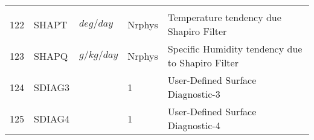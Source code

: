 \begin{tabular}{lllll}
\begin{minipage}[t]{3in}
         \end{minipage}\\
122& SHAPT    &    $deg/day$ &  Nrphys
         &\begin{minipage}[t]{3in}
          {Temperature tendency due Shapiro Filter}
         \end{minipage}\\
123& SHAPQ    &    $g/kg/day$ &  Nrphys
         &\begin{minipage}[t]{3in}
          {Specific Humidity tendency due to Shapiro Filter}
         \end{minipage}\\
124& SDIAG3   &             &    1  
         &\begin{minipage}[t]{3in}
          {User-Defined Surface Diagnostic-3} 
         \end{minipage}\\
125& SDIAG4   &             &    1  
         &\begin{minipage}[t]{3in}
          {User-Defined Surface Diagnostic-4} 
         \end{minipage}\\
\end{tabular}
\vspace{1.5in}
\vfill

